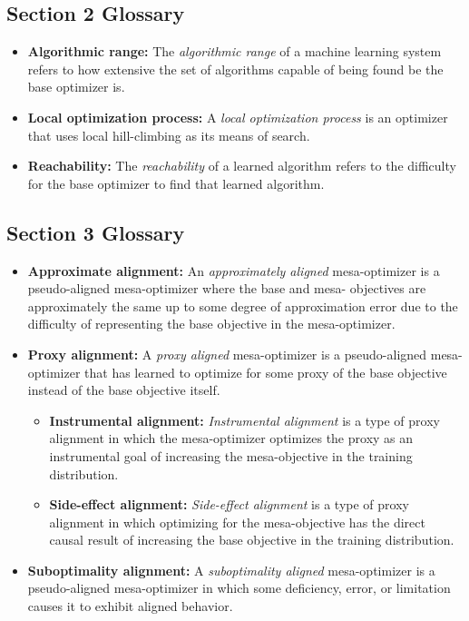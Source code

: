 \documentclass[
  onecolumn,
  natbib,
]{miri-tech-article}
\begin{document}
\subsection{Section 2 Glossary}
\begin{itemize}
\item \textbf{Algorithmic range:} The \textit{algorithmic range} of a machine learning system refers to how extensive the set of algorithms capable of being found be the base optimizer is.
\item \textbf{Local optimization process:} A \textit{local optimization process} is an optimizer that uses local hill-climbing as its means of search.
\item \textbf{Reachability:} The \textit{reachability} of a learned algorithm refers to the difficulty for the base optimizer to find that learned algorithm.
\end{itemize}

\subsection{Section 3 Glossary}
\begin{itemize}
\item \textbf{Approximate alignment:} An \textit{approximately aligned} mesa-optimizer is a pseudo-aligned mesa-optimizer where the base and mesa- objectives are approximately the same up to some degree of approximation error due to the difficulty of representing the base objective in the mesa-optimizer.
\item \textbf{Proxy alignment:} A \textit{proxy aligned} mesa-optimizer is a pseudo-aligned mesa-optimizer that has learned to optimize for some proxy of the base objective instead of the base objective itself.
  \begin{itemize}
  \item \textbf{Instrumental alignment:} \textit{Instrumental alignment} is a type of proxy alignment in which the mesa-optimizer optimizes the proxy as an instrumental goal of increasing the mesa-objective in the training distribution.
  \item \textbf{Side-effect alignment:} \textit{Side-effect alignment} is a type of proxy alignment in which optimizing for the mesa-objective has the direct causal result of increasing the base objective in the training distribution.
  \end{itemize}
\item \textbf{Suboptimality alignment:} A \textit{suboptimality aligned} mesa-optimizer is a pseudo-aligned mesa-optimizer in which some deficiency, error, or limitation causes it to exhibit aligned behavior.
\end{itemize}
\end{document}
